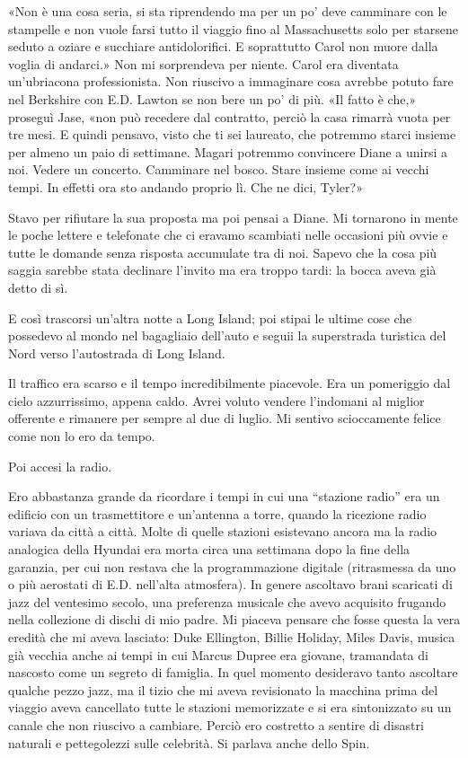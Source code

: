 «Non è una cosa seria, si sta riprendendo ma per un po' deve camminare
con le stampelle e non vuole farsi tutto il viaggio fino al
Massachusetts solo per starsene seduto a oziare e succhiare
antidolorifici. E soprattutto Carol non muore dalla voglia di andarci.»
Non mi sorprendeva per niente. Carol era diventata un'ubriacona
professionista. Non riuscivo a immaginare cosa avrebbe potuto fare nel
Berkshire con E.D. Lawton se non bere un po' di più. «Il fatto è che,»
proseguì Jase, «non può recedere dal contratto, perciò la casa rimarrà
vuota per tre mesi. E quindi pensavo, visto che ti sei laureato, che
potremmo starci insieme per almeno un paio di settimane. Magari potremmo
convincere Diane a unirsi a noi. Vedere un concerto. Camminare nel
bosco. Stare insieme come ai vecchi tempi. In effetti ora sto andando
proprio lì. Che ne dici, Tyler?»

Stavo per rifiutare la sua proposta ma poi pensai a Diane. Mi tornarono
in mente le poche lettere e telefonate che ci eravamo scambiati nelle
occasioni più ovvie e tutte le domande senza risposta accumulate tra di
noi. Sapevo che la cosa più saggia sarebbe stata declinare l'invito ma
era troppo tardi: la bocca aveva già detto di sì.

\separatorefiori

E così trascorsi un'altra notte a Long Island; poi stipai le ultime cose
che possedevo al mondo nel bagagliaio dell'auto e seguii la superstrada
turistica del Nord verso l'autostrada di Long Island.

Il traffico era scarso e il tempo incredibilmente piacevole. Era un
pomeriggio dal cielo azzurrissimo, appena caldo. Avrei voluto vendere
l'indomani al miglior offerente e rimanere per sempre al due di luglio.
Mi sentivo scioccamente felice come non lo ero da tempo.

Poi accesi la radio.

Ero abbastanza grande da ricordare i tempi in cui una ``stazione radio''
era un edificio con un trasmettitore e un'antenna a torre, quando la
ricezione radio variava da città a città. Molte di quelle stazioni
esistevano ancora ma la radio analogica della Hyundai era morta circa
una settimana dopo la fine della garanzia, per cui non restava che la
programmazione digitale (ritrasmessa da uno o più aerostati di E.D.
nell'alta atmosfera). In genere ascoltavo brani scaricati di jazz del
ventesimo secolo, una preferenza musicale che avevo acquisito frugando
nella collezione di dischi di mio padre. Mi piaceva pensare che fosse
questa la vera eredità che mi aveva lasciato: Duke Ellington, Billie
Holiday, Miles Davis, musica già vecchia anche ai tempi in cui Marcus
Dupree era giovane, tramandata di nascosto come un segreto di famiglia.
In quel momento desideravo tanto ascoltare qualche pezzo jazz, ma il
tizio che mi aveva revisionato la macchina prima del viaggio aveva
cancellato tutte le stazioni memorizzate e si era sintonizzato su un
canale che non riuscivo a cambiare. Perciò ero costretto a sentire di
disastri naturali e pettegolezzi sulle celebrità. Si parlava anche dello
Spin.

